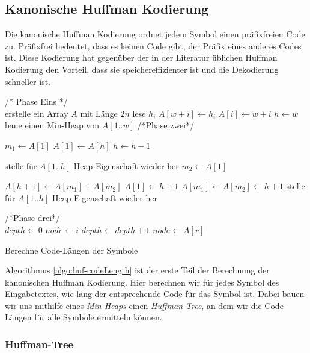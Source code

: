 \documentclass[a4paper,11pt]{scrartcl}%
\theoremstyle{change}
\theoremstyle{nonumberplain}
\theoremstyle{change}
\theoremstyle{nonumberplain}
\theoremstyle{change}
\theoremstyle{nonumberplain}
\begin{document}
\subsection{Kanonische Huffman Kodierung}

Die kanonische Huffman Kodierung ordnet jedem Symbol einen präfixfreien Code zu. Präfixfrei bedeutet, dass es keinen Code gibt, der Präfix eines anderes Codes ist.
Diese Kodierung hat gegenüber der in der Literatur üblichen Huffman Kodierung\cite[S. 141ff]{dataCompressionHeld} den Vorteil, dass sie speichereffizienter ist und die Dekodierung schneller ist. \cite[S. 335]{managingGigabytes}

\begin{algorithm}[t]
	\SetAlgoLined
	\SetAlgoNoEnd%
	/* Phase Eins */\\
	erstelle ein Array $A$ mit Länge $2n$\;
	 {
		lese $h_i$
		$A[w+i]\leftarrow h_i$\;
		$A[i]\leftarrow w + i$\;
	} 
	$h\leftarrow w$\;
	baue einen Min-Heap von $A[1..w]$\;
	/*Phase zwei*/\\
	 {
		$m_1 \leftarrow A[1]$\;
		$A[1] \leftarrow A[h]$\;
		$h \leftarrow h - 1$\;
		
		stelle für $A[1..h]$ Heap-Eigenschaft wieder her\;
		$m_2 \leftarrow A[1]$
		
		$A[h+1] \leftarrow A[m_1] + A[m_2]$\;
		$A[1] \leftarrow h+1$\;
		$A[m_1] \leftarrow A[m_2] \leftarrow h + 1$
		stelle für $A[1..h]$ Heap-Eigenschaft wieder her\;	
	}
	/*Phase drei*/\\
	 {
		$depth\leftarrow 0$\;
		$node\leftarrow i $\;
		 {
			$depth\leftarrow depth + 1$\;
			$node\leftarrow A[r]$\;
		}
	}


	\caption{Berechne Code-Längen der Symbole \cite[S. 341]{managingGigabytes}}
	\label{algo:huf-codeLength}
\end{algorithm}

Algorithmus \ref{algo:huf-codeLength} ist der erste Teil der Berechnung der kanonischen Huffman Kodierung. Hier berechnen wir für jedes Symbol des Eingabetextes, wie lang der entsprechende Code für das Symbol ist. Dabei bauen wir uns mithilfe eines \textit{Min-Heaps} einen \textit{Huffman-Tree}, an dem wir die Code-Längen für alle Symbole ermitteln können.

\subsubsection{Huffman-Tree}
\end{document}
